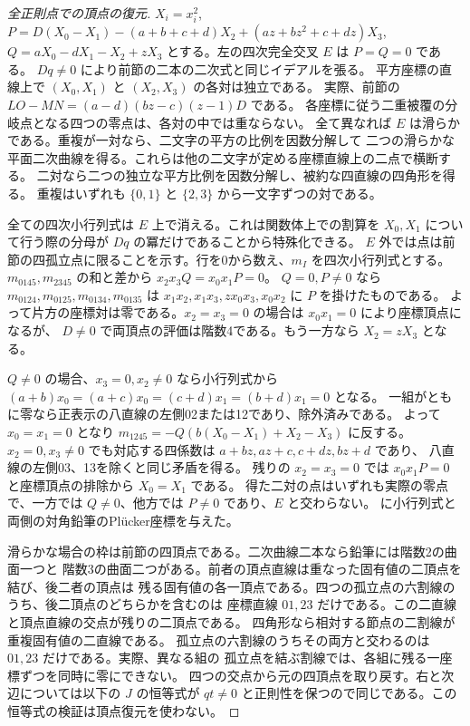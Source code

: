 \begin{proof}[全正則点での頂点の復元]
$X_i=x_i^2$, $P=D(X_0-X_1)-(a+b+c+d)X_2+(az+bz^2+c+dz)X_3$,
$Q=aX_0-dX_1-X_2+zX_3$ とする。左の四次完全交叉 $E$ は $P=Q=0$ である。
$Dq\ne0$ により前節の二本の二次式と同じイデアルを張る。
平方座標の直線上で $(X_0,X_1)$ と $(X_2,X_3)$ の各対は独立である。
実際、前節の $LO-MN=(a-d)(bz-c)(z-1)D$ である。
各座標に従う二重被覆の分岐点となる四つの零点は、各対の中では重ならない。
全て異なれば $E$ は滑らかである。重複が一対なら、二文字の平方の比例を因数分解して
二つの滑らかな平面二次曲線を得る。これらは他の二文字が定める座標直線上の二点で横断する。
二対なら二つの独立な平方比例を因数分解し、被約な四直線の四角形を得る。
重複はいずれも $\{0,1\}$ と $\{2,3\}$ から一文字ずつの対である。

全ての四次小行列式は $E$ 上で消える。これは関数体上での割算を
$X_0,X_1$ について行う際の分母が $Dq$ の冪だけであることから特殊化できる。
$E$ 外では点は前節の四孤立点に限ることを示す。行を0から数え、$m_I$ を四次小行列式とする。
$m_{0145},m_{2345}$ の和と差から $x_2x_3 Q=x_0x_1 P=0$。
$Q=0,P\ne0$ なら $m_{0124},m_{0125},m_{0134},m_{0135}$ は
$x_1x_2,x_1x_3,zx_0x_3,x_0x_2$ に $P$ を掛けたものである。
よって片方の座標対は零である。$x_2=x_3=0$ の場合は $x_0x_1=0$ により座標頂点になるが、
$D\ne0$ で両頂点の評価は階数4である。もう一方なら $X_2=zX_3$ となる。

$Q\ne0$ の場合、$x_3=0,x_2\ne0$ なら小行列式から
$(a+b)x_0=(a+c)x_0=(c+d)x_1=(b+d)x_1=0$ となる。
一組がともに零なら正表示の八直線の左側02または12であり、除外済みである。
よって $x_0=x_1=0$ となり $m_{1245}=-Q(b(X_0-X_1)+X_2-X_3)$ に反する。
$x_2=0,x_3\ne0$ でも対応する四係数は $a+bz,az+c,c+dz,bz+d$ であり、
八直線の左側03、13を除くと同じ矛盾を得る。
残りの $x_2=x_3=0$ では $x_0x_1P=0$ と座標頂点の排除から $X_0=X_1$ である。
得た二対の点はいずれも実際の零点で、一方では $Q\ne0$、他方では $P\ne0$ であり、$E$ と交わらない。
 に小行列式と両側の対角鉛筆のPlücker座標を与えた。

滑らかな場合の枠は前節の四頂点である。二次曲線二本なら鉛筆には階数2の曲面一つと
階数3の曲面二つがある。前者の頂点直線は重なった固有値の二頂点を結び、後二者の頂点は
残る固有値の各一頂点である。四つの孤立点の六割線のうち、後二頂点のどちらかを含むのは
座標直線 $01,23$ だけである。この二直線と頂点直線の交点が残りの二頂点である。
四角形なら相対する節点の二割線が重複固有値の二直線である。
孤立点の六割線のうちその両方と交わるのは $01,23$ だけである。実際、異なる組の
孤立点を結ぶ割線では、各組に残る一座標ずつを同時に零にできない。
四つの交点から元の四頂点を取り戻す。右と次辺については以下の $J$ の恒等式が
$qt\ne0$ と正則性を保つので同じである。この恒等式の検証は頂点復元を使わない。
\end{proof}

